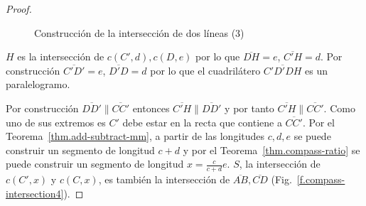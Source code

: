 \begin{proof}
\begin{figure}[b]
\begin{center}
\end{center}
\caption{Construcción de la intersección de dos líneas (3)}\label{f.compass-intersection3}
\end{figure}

$H$ es la intersección de $c(C',d), c(D,e)$ por lo que $\overline{DH}=e$, $\overline{C'H}=d$. Por construcción $\overline{C'D'} = e$, $\overline{D'D}=d$ por lo que el cuadrilátero $\overline{C'D'DH}$ es un paralelogramo. 

Por construcción $\overline{DD'}\parallel\overline{CC'}$ entonces $\overline{C'H}\parallel \overline{DD'}$ y por tanto $\overline{C'H}\parallel\overline{CC'}$. Como uno de sus extremos es $C'$ debe estar en la recta que contiene a $\overline{CC'}$. Por el Teorema~\ref{thm.add-subtract-mm}, a partir de las longitudes $c,d,e$ se puede construir un segmento de longitud $c+d$ y por el Teorema~\ref{thm.compass-ratio} se puede construir un segmento de longitud $x=\displaystyle\frac{c}{c+d}e$. $S$, la intersección de $c(C',x)$ y $c(C,x)$, es también la intersección de $\overline{AB}, \overline{CD}$ (Fig.~\ref{f.compass-intersection4}).
\end{proof}

